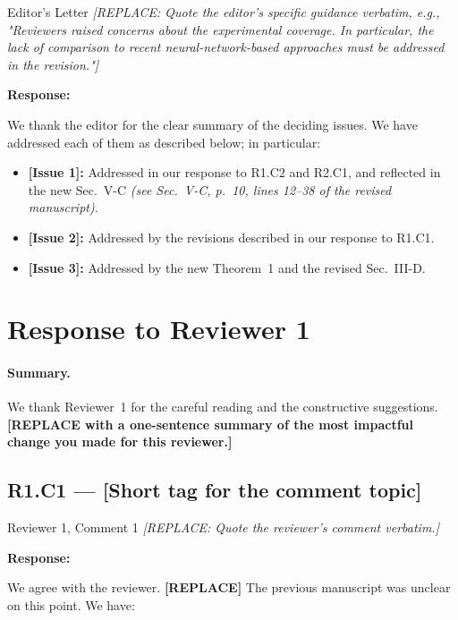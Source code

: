 \documentclass[11pt,letterpaper]{article}
\newcommand{\response}{\par\textbf{\color{responseaccent}Response:}\par}
\newcommand{\paperref}[1]{\textit{(see #1 of the revised manuscript)}}
\begin{document}
\begin{reviewercomment}{Editor's Letter}
\textit{[REPLACE: Quote the editor's specific guidance verbatim, e.g.,
"Reviewers raised concerns about the experimental coverage. In
particular, the lack of comparison to recent neural-network-based
approaches must be addressed in the revision."]}
\end{reviewercomment}

\response
We thank the editor for the clear summary of the deciding issues. We
have addressed each of them as described below; in particular:

\begin{itemize}[itemsep=2pt,topsep=2pt]
    \item \textbf{[Issue 1]:} Addressed in our response to R1.C2 and
          R2.C1, and reflected in the new Sec.~V-C
          \paperref{Sec.~V-C, p.~10, lines 12--38}.
    \item \textbf{[Issue 2]:} Addressed by the revisions described in
          our response to R1.C1.
    \item \textbf{[Issue 3]:} Addressed by the new Theorem~1 and the
          revised Sec.~III-D.
\end{itemize}

\section*{Response to Reviewer 1}

\paragraph{Summary.} We thank Reviewer~1 for the careful reading and the
constructive suggestions. \textbf{[REPLACE with a one-sentence summary
of the most impactful change you made for this reviewer.]}

\subsection*{R1.C1 --- [Short tag for the comment topic]}

\begin{reviewercomment}{Reviewer 1, Comment 1}
\textit{[REPLACE: Quote the reviewer's comment verbatim.]}
\end{reviewercomment}

\response We agree with the reviewer. \textbf{[REPLACE]} The previous
manuscript was unclear on this point. We have:
\end{document}
